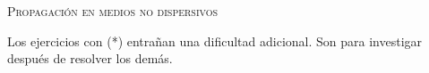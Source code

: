 \documentclass[11pt, spanish, a4paper, twopage]{article}
\begin{document}
\begin{center}
	\textsc{\LARGE Propagación en medios no dispersivos}
\end{center}

Los ejercicios con (*) entrañan una dificultad adicional. Son para investigar después de resolver los demás.



\begin{enumerate}


}


\end{enumerate}
\end{document}
